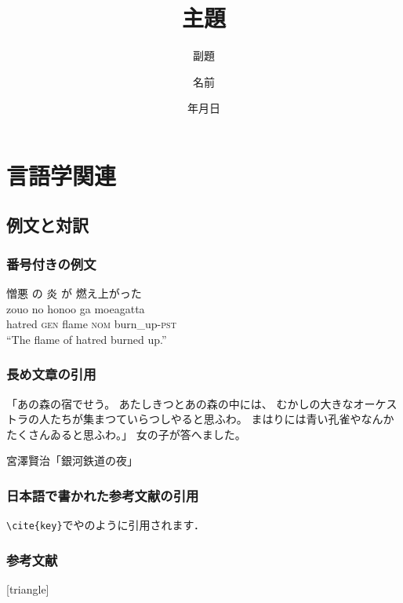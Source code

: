 \documentclass[11pt]{beamer}
\title{主題}
\subtitle{副題}
\institute{所属}
\author{名前}
\date{{\number\year}年{\number\month}月{\number\day}日}
\begin{document}
\begin{frame}
    \nocite{demo}
    \maketitle
\end{frame}

\section{言語学関連}
\subsection{例文と対訳}
\begin{frame}
\frametitle{番号付きの例文}
    \begin{exe}
        \ex%
        \glll%
        {憎悪} {の} {炎} {が} {燃え上がった} \\
        {zouo} {no} {honoo} {ga} {moeagatta} \\
        {hatred} {\textsc{gen}} {flame} {\textsc{nom}} {burn\_up-\textsc{pst}} \\
        \trans%
        ``The flame of hatred burned up.''
    \end{exe}
\end{frame}

\begin{frame}
    \frametitle{長め文章の引用}
    \begin{leftbar}
        「あの森の宿でせう。
        あたしきつとあの森の中には、
        むかしの大きなオーケストラの人たちが集まつていらつしやると思ふわ。
        まはりには青い孔雀やなんかたくさんゐると思ふわ。」
        女の子が答へました。

        \hfill 宮澤賢治「銀河鉄道の夜」
    \end{leftbar}
\end{frame}

\begin{frame}
\frametitle{日本語で書かれた参考文献の引用}
\texttt{{\textbackslash}cite\{key\}}で\cite{demo}や\cite{japanese}のように引用されます．
\end{frame}

\begin{frame}[allowframebreaks]
\frametitle{参考文献}
\begingroup
\scriptsize
    [triangle]
    
    
\endgroup
\end{frame}
\end{document}
